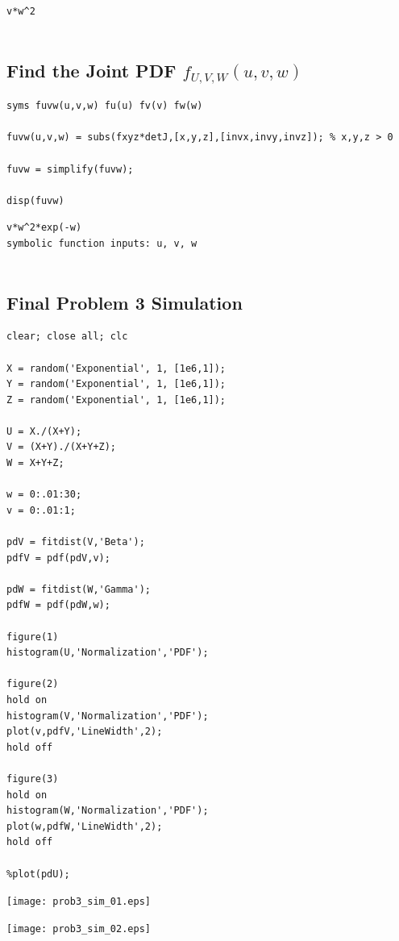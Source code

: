 \documentclass[12pt]{article}
\begin{document}
        \color{lightgray} \begin{verbatim}v*w^2
 
\end{verbatim} \color{black}
    

\subsection*{Find the Joint PDF $f_{U,V,W}(u,v,w)$}

\begin{verbatim}
syms fuvw(u,v,w) fu(u) fv(v) fw(w)

fuvw(u,v,w) = subs(fxyz*detJ,[x,y,z],[invx,invy,invz]); % x,y,z > 0

fuvw = simplify(fuvw);

disp(fuvw)
\end{verbatim}

        \color{lightgray} \begin{verbatim}v*w^2*exp(-w)
symbolic function inputs: u, v, w
 
\end{verbatim} \color{black}
    

\subsection*{Final Problem 3 Simulation}

\begin{verbatim}
clear; close all; clc

X = random('Exponential', 1, [1e6,1]);
Y = random('Exponential', 1, [1e6,1]);
Z = random('Exponential', 1, [1e6,1]);

U = X./(X+Y);
V = (X+Y)./(X+Y+Z);
W = X+Y+Z;

w = 0:.01:30;
v = 0:.01:1;

pdV = fitdist(V,'Beta');
pdfV = pdf(pdV,v);

pdW = fitdist(W,'Gamma');
pdfW = pdf(pdW,w);

figure(1)
histogram(U,'Normalization','PDF');

figure(2)
hold on
histogram(V,'Normalization','PDF');
plot(v,pdfV,'LineWidth',2);
hold off

figure(3)
hold on
histogram(W,'Normalization','PDF');
plot(w,pdfW,'LineWidth',2);
hold off

%plot(pdU);
\end{verbatim}

\texttt{[image: prob3\_sim\_01.eps]}

\texttt{[image: prob3\_sim\_02.eps]}
\end{document}
